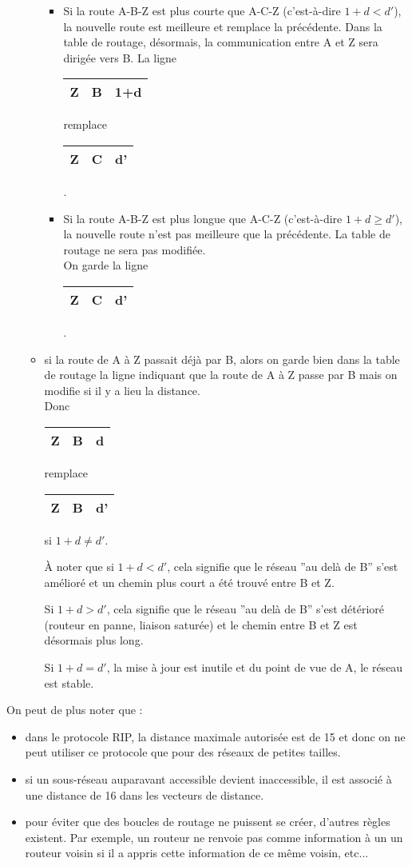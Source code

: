 \documentclass[11pt,a4paper,french,twoside]{PMCours}
\begin{document}
\begin{itemize}
\begin{itemize}
\begin{itemize}
\item Si la route A-B-Z est plus courte que A-C-Z (c'est-à-dire $1+d<d'$), 
la nouvelle route est meilleure et remplace la précédente. Dans la table de 
routage, désormais, la communication entre A et Z sera dirigée vers B.
La ligne \begin{tabular}{|l|l|l|}\hline Z&B&1+d \\ \hline \end{tabular} 
remplace \begin{tabular}{|l|l|l|}\hline Z&C&d' \\ \hline \end{tabular}.
\item Si la route A-B-Z est plus longue que A-C-Z (c'est-à-dire $1+d\geq d'$), la nouvelle route n'est pas meilleure que la précédente. La table de routage ne sera pas modifiée.\\
On garde la ligne \begin{tabular}{|l|l|l|}\hline Z&C&d' \\ \hline \end{tabular}.
\end{itemize}    
\item si la route de A à Z passait déjà par B, alors on garde bien dans la table de routage la ligne indiquant que la route de A à Z passe par B mais on modifie si il y a lieu la distance. \\
Donc \begin{tabular}{|l|l|l|}\hline Z&B&d \\ \hline \end{tabular} remplace \begin{tabular}{|l|l|l|}\hline Z&B&d'\\ \hline \end{tabular} si $1+d\neq d'$.

\medskip
À noter que si $1+d<d'$, cela signifie que le réseau ''au delà de B'' s'est 
amélioré et un chemin plus court a été trouvé entre B et Z.

Si $1+d>d'$, cela signifie que le réseau ''au delà de B'' s'est détérioré (routeur en panne, liaison saturée) et le chemin entre B et Z est désormais plus long.

Si $1+d=d'$, la mise à jour est inutile et du point de vue de A, le réseau est stable.
\end{itemize}
\end{itemize}
On peut de plus noter que :
\begin{itemize}
\item dans le protocole RIP, la distance maximale autorisée est de 15 et donc on ne peut utiliser ce protocole que pour des réseaux de petites tailles.  
\item si un sous-réseau auparavant accessible devient inaccessible, il est associé à une distance de 16 dans les vecteurs de distance.   
\item pour éviter que des boucles de routage ne puissent se créer, d'autres règles existent. Par exemple, un routeur ne renvoie pas comme information à un un routeur voisin si il a appris cette information de ce même voisin, etc...   
\end{itemize}
\end{document}
